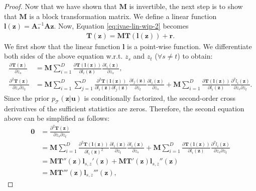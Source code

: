 \documentclass[nohyperref]{article}
\theoremstyle{plain}
\theoremstyle{definition}
\theoremstyle{remark}
\begin{document}
\begin{proof}
    Now that we have shown that $\mathbf{M}$ is invertible, the next step is to show that $\mathbf{M}$ is a block transformation matrix. We define a linear function $\mathbf{l}(\mathbf{z})=\mathbf{A}_{*}^{-1}\mathbf{A}\mathbf{z}$. Now, Equation \eqref{eq:ivae-lin-wip-2} becomes
    \begin{align}
        \mathbf{T}(\mathbf{z})=\mathbf{M}\mathbf{T}(\mathbf{l}(\mathbf{z})) +\mathbf{r}.\label{eq:identifiability}
    \end{align}
    We first show that the linear function $\mathbf{l}$ is a point-wise function. We differentiate both sides of the above equation w.r.t. $z_s$ and $z_t$ ($\forall s\not=t$) to obtain:
    \begin{align}
        \frac{\partial\mathbf{T}(\mathbf{z})}{\partial z_s} &= \mathbf{M}\sum_{i=1}^D\frac{\partial \mathbf{T}(\mathbf{l}(\mathbf{z}))}{\partial l_i(\mathbf{z})}\frac{\partial l_i(\mathbf{z})}{\partial z_s},\\
        \frac{\partial^2\mathbf{T}(\mathbf{z})}{\partial z_s\partial z_t} &= \mathbf{M}\sum_{i=1}^D \sum_{j=1}^D \frac{\partial^2 \mathbf{T}(\mathbf{l}(\mathbf{z}))}{\partial l_i(\mathbf{z}) \partial l_j(\mathbf{z})}\frac{\partial l_j(\mathbf{z})}{\partial z_t} \frac{\partial l_i(\mathbf{z})}{\partial z_s}  + \mathbf{M}\sum_{i=1}^D\frac{\partial \mathbf{T}(\mathbf{l}(\mathbf{z}))}{\partial l_i(\mathbf{z})}\frac{\partial^2 l_i(\mathbf{z})}{\partial z_s \partial z_t}.
    \end{align}
    Since the prior $p_{\mathcal{T}}(\mathbf{z}|\mathbf{u})$ is conditionally factorized, the second-order cross derivatives of the sufficient statistics are zeros. Therefore, the second equation above can be simplified as follows:
    \begin{align}
        \mathbf{0} &= \frac{\partial^2\mathbf{T}(\mathbf{z})}{\partial z_s\partial z_t}\\
        &= \mathbf{M}\sum_{i=1}^D \frac{\partial^2 \mathbf{T}(\mathbf{l}(\mathbf{z}))}{\partial l_i(\mathbf{z})^2}\frac{\partial l_i(\mathbf{z})}{\partial z_t} \frac{\partial l_i(\mathbf{z})}{\partial z_s}  + \mathbf{M}\sum_{i=1}^D\frac{\partial \mathbf{T}(\mathbf{l}(\mathbf{z}))}{\partial l_i(\mathbf{z})}\frac{\partial^2 l_i(\mathbf{z})}{\partial z_s \partial z_t}\\
        &= \mathbf{M}\mathbf{T}''(\mathbf{z})\mathbf{l}_{s,z}'(\mathbf{z})+\mathbf{M}\mathbf{T}'(\mathbf{z})\mathbf{l}_{s,z}''(\mathbf{z})\\
        &=\mathbf{M}\mathbf{T}'''(\mathbf{z})\mathbf{l}_{s,z}'''(\mathbf{z}),

\end{align}
\end{proof}
\end{document}

